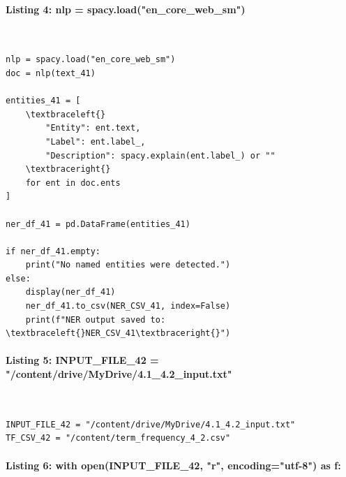 \documentclass[12pt,a4paper,oneside]{report}
\begin{document}
\paragraph{Listing 4: nlp = spacy.load("en\_core\_web\_sm")}\mbox{}\\[-1ex]
\begin{Verbatim}[commandchars=\\\{\},breaklines=true,breakanywhere=true,fontsize=\scriptsize,frame=leftline,framesep=2mm,rulecolor=\color{gray}]
nlp = spacy.load("en_core_web_sm")
doc = nlp(text_41)

entities_41 = [
    \textbraceleft{}
        "Entity": ent.text,
        "Label": ent.label_,
        "Description": spacy.explain(ent.label_) or ""
    \textbraceright{}
    for ent in doc.ents
]

ner_df_41 = pd.DataFrame(entities_41)

if ner_df_41.empty:
    print("No named entities were detected.")
else:
    display(ner_df_41)
    ner_df_41.to_csv(NER_CSV_41, index=False)
    print(f"NER output saved to: \textbraceleft{}NER_CSV_41\textbraceright{}")
\end{Verbatim}
\paragraph{Listing 5: INPUT\_FILE\_42 = "/content/drive/MyDrive/4.1\_4.2\_input.txt"}\mbox{}\\[-1ex]
\begin{Verbatim}[commandchars=\\\{\},breaklines=true,breakanywhere=true,fontsize=\scriptsize,frame=leftline,framesep=2mm,rulecolor=\color{gray}]
INPUT_FILE_42 = "/content/drive/MyDrive/4.1_4.2_input.txt"
TF_CSV_42 = "/content/term_frequency_4_2.csv"
\end{Verbatim}
\paragraph{Listing 6: with open(INPUT\_FILE\_42, "r", encoding="utf-8") as f:}\mbox{}\\[-1ex]
\end{document}
